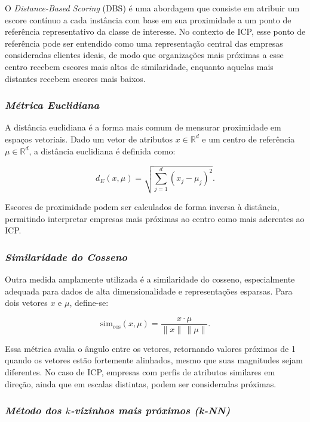 O \textit{Distance-Based Scoring} (DBS) é uma abordagem que consiste em
atribuir um escore contínuo a cada instância com base em sua proximidade
a um ponto de referência representativo da classe de interesse. No
contexto de ICP, esse ponto de referência pode ser entendido como uma
representação central das empresas consideradas clientes ideais, de modo
que organizações mais próximas a esse centro recebem escores mais altos
de similaridade, enquanto aquelas mais distantes recebem escores mais
baixos.

\subsubsection{\textit{Métrica Euclidiana}}

A distância euclidiana é a forma mais comum de mensurar proximidade em
espaços vetoriais. Dado um vetor de atributos $x \in \mathbb{R}^d$ e um
centro de referência $\mu \in \mathbb{R}^d$, a distância euclidiana é
definida como:

\begin{equation}
d_{E}(x, \mu) = \sqrt{\sum_{j=1}^{d} (x_j - \mu_j)^2}.
\end{equation}

Escores de proximidade podem ser calculados de forma inversa à
distância, permitindo interpretar empresas mais próximas ao centro como
mais aderentes ao ICP.

\subsubsection{\textit{Similaridade do Cosseno}}

Outra medida amplamente utilizada é a similaridade do cosseno,
especialmente adequada para dados de alta dimensionalidade e
representações esparsas. Para dois vetores $x$ e $\mu$, define-se:

\begin{equation}
\text{sim}_{\cos}(x,\mu) = \frac{x \cdot \mu}{\lVert x \rVert \, \lVert \mu \rVert}.
\end{equation}

Essa métrica avalia o ângulo entre os vetores, retornando valores
próximos de 1 quando os vetores estão fortemente alinhados, mesmo que
suas magnitudes sejam diferentes. No caso de ICP, empresas com perfis de
atributos similares em direção, ainda que em escalas distintas, podem
ser consideradas próximas.

\subsubsection{\textit{Método dos $k$-vizinhos mais próximos (k-NN)}}

